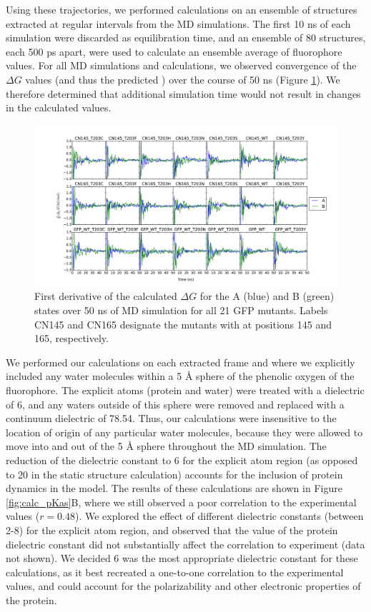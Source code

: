 Using these trajectories, we performed \pKa{} calculations on an ensemble of structures extracted at regular intervals from the MD simulations.
The first 10 \si{\ns} of each simulation were discarded as equilibration time, and an ensemble of 80 structures, each 500 ps apart, were used to calculate an ensemble average of fluorophore \pKa{} values.
For all MD simulations and \pKa{} calculations, we observed convergence of the $\Delta G$ values (and thus the predicted \pKa{}) over the course of 50 \si{\ns} (Figure \ref{fig:dG_1stD}).
We therefore determined that additional simulation time would not result in changes in the calculated \pKa{} values. 

\begin{figure}
    \center
    \includegraphics[width=\double]{figures-gfp-pKa/dG_firstDerivative.pdf}
    \caption{
        First derivative of the calculated $\Delta G$ for the A (blue) and B (green) states over 50 ns of MD simulation for all 21 GFP mutants. 
        Labels CN145 and CN165 designate the mutants with \pCNF{} at positions 145 and 165, respectively.
    }
    \label{fig:dG_1stD}
\end{figure}

We performed our \pKa{} calculations on each extracted frame and where we explicitly included any water molecules within a 5 \si{\angstrom} sphere of the phenolic oxygen of the fluorophore.
The explicit atoms (protein and water) were treated with a dielectric of 6, and any waters outside of this sphere were removed and replaced with a continuum dielectric of 78.54.
Thus, our calculations were insensitive to the location of origin of any particular water molecules, because they were allowed to move into and out of the 5 \si{\angstrom} sphere throughout the MD simulation.
The reduction of the dielectric constant to 6 for the explicit atom region (as opposed to 20 in the static structure calculation) accounts for the inclusion of protein dynamics in the model.
The results of these calculations are shown in Figure \ref{fig:calc_pKas}B, where we still observed a poor correlation to the experimental values ($r = 0.48$).
We explored the effect of different dielectric constants (between 2-8) for the explicit atom region, and observed that the value of the protein dielectric constant did not substantially affect the correlation to experiment (data not shown).
We decided 6 was the most appropriate dielectric constant for these calculations, as it best recreated a one-to-one correlation to the experimental \pKa{} values, and could account for the polarizability and other electronic properties of the protein.

